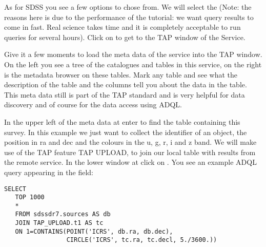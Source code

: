 \documentclass[twoside]{article}[12pt]
\begin{document}
As for SDSS you see a few options to chose from. We will select the
 (Note: the reasons here is due to the performance
of the tutorial: we want query results to come in fast. Real science
takes time and it is completely acceptable to run queries for several hours).
Click on  to get to the TAP window of the Service. 

Give it a few moments to load the meta data of the service into the TAP
window. On the left you see a tree of the catalogues and tables in this
service, on the right is the metadata browser on these tables. Mark any
table and see what the description of the table and the columns tell you
about the data in the table. This meta data still is part of the TAP
standard and is very helpful for data discovery and of course for the
data access using ADQL. 

In the upper left of the meta data at  enter  to
find the table containing this survey. In this example we just want to
collect the identifier of an object, the position in ra and dec and the
colours in the u, g, r, i and z band. We will make use of the TAP
feature TAP UPLOAD, to join our local table with results from the remote
service. In the lower window at 
click on  \goto {} \goto{}. You see an example
ADQL query appearing in the field:


\lstset{style=daiquiri, language=SQL}
\begin{lstlisting}
SELECT
   TOP 1000
   *
   FROM sdssdr7.sources AS db
   JOIN TAP_UPLOAD.t1 AS tc
   ON 1=CONTAINS(POINT('ICRS', db.ra, db.dec),
                 CIRCLE('ICRS', tc.ra, tc.decl, 5./3600.))
\end{lstlisting}
\end{document}
